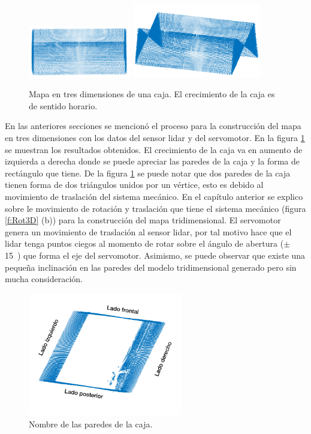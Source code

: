 \begin{figure}
  \includegraphics[width=0.40\textwidth]{images/caja3D_8.png}
  \includegraphics[width=0.50\textwidth]{images/caja3D_9.png}
  \captionsetup{font=footnotesize}
  \caption{Mapa en tres dimensiones de una caja. El crecimiento de la caja es de sentido 
  horario.}
  \label{fig:Caja3D}
\end{figure}

En las anteriores secciones se mencionó el proceso para la construcción del mapa en 
tres dimensiones con los datos del sensor lidar y del servomotor. En la figura 
\ref{fig:Caja3D} se muestran los resultados obtenidos. El crecimiento de la caja va en
aumento de izquierda a derecha donde se puede apreciar las paredes de la caja y la forma
de rectángulo que tiene. De la figura \ref{fig:Caja3D} se puede notar que dos paredes de 
la caja tienen forma de dos triángulos unidos por un vértice, esto es debido al movimiento 
de traslación del sistema mecánico. En el capítulo anterior se explico sobre le movimiento 
de rotación y traslación que tiene el sistema mecánico (figura \ref{f:Rot3D} (b)) para la 
construcción del mapa tridimensional. El servomotor genera un movimiento de traslación al 
sensor lidar, por tal motivo hace que el lidar tenga puntos ciegos al momento de rotar 
sobre el ángulo de abertura ($\pm$ 15\grad~) que forma el eje del servomotor. Asimismo,
se puede observar que existe una pequeña inclinación en las paredes del modelo 
tridimensional generado pero sin mucha consideración.

\begin{figure}
  \centering \footnotesize
  \includegraphics[width=0.60\textwidth]{images/lados_caja.png}
  \captionsetup{font=footnotesize}
  \caption{Nombre de las paredes de la caja.}
  \label{fig:paredCaja}
\end{figure}

